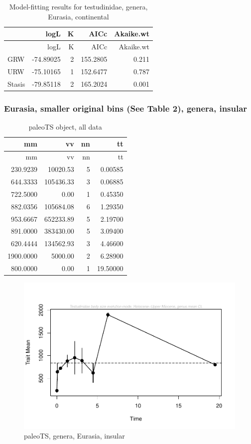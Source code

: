 \documentclass[]{article}
\begin{document}
\begin{longtable}[]{@{}lrrrr@{}}
\caption{Model-fitting results for testudinidae, genera, Eurasia,
continental}\tabularnewline
\toprule
& logL & K & AICc & Akaike.wt\tabularnewline
\midrule
\endfirsthead
\toprule
& logL & K & AICc & Akaike.wt\tabularnewline
\midrule
\endhead
GRW & -74.89025 & 2 & 155.2805 & 0.211\tabularnewline
URW & -75.10165 & 1 & 152.6477 & 0.787\tabularnewline
Stasis & -79.85118 & 2 & 165.2024 & 0.001\tabularnewline
\bottomrule
\end{longtable}

\newpage 

\subsubsection{Eurasia, smaller original bins (See Table 2), genera,
insular}\label{eurasia-smaller-original-bins-see-table-2-genera-insular}

\begin{longtable}[]{@{}rrrr@{}}
\caption{paleoTS object, all data}\tabularnewline
\toprule
mm & vv & nn & tt\tabularnewline
\midrule
\endfirsthead
\toprule
mm & vv & nn & tt\tabularnewline
\midrule
\endhead
230.9239 & 10020.53 & 5 & 0.00585\tabularnewline
644.3333 & 105436.33 & 3 & 0.06885\tabularnewline
722.5000 & 0.00 & 1 & 0.45350\tabularnewline
882.0356 & 105684.08 & 6 & 1.29350\tabularnewline
953.6667 & 652233.89 & 5 & 2.19700\tabularnewline
891.0000 & 383430.00 & 5 & 3.09400\tabularnewline
620.4444 & 134562.93 & 3 & 4.46600\tabularnewline
1900.0000 & 5000.00 & 2 & 6.28900\tabularnewline
800.0000 & 0.00 & 1 & 19.50000\tabularnewline
\bottomrule
\end{longtable}

\begin{figure}[htbp]
\centering
\includegraphics{MA_JJ_files/figure-latex/pTSEsI-1.pdf}
\caption{paleoTS, genera, Eurasia, insular}
\end{figure}
\end{document}

